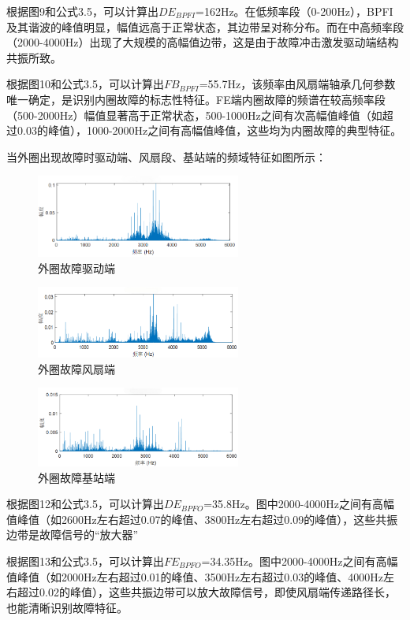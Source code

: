 \documentclass[a4paper]{CPIPC}
\numberwithin{equation}{section}
\begin{document}
根据图9和公式3.5，可以计算出$DE_{BPFI}$=162Hz。在低频率段（0-200Hz），BPFI及其谐波的峰值明显，幅值远高于正常状态，其边带呈对称分布。而在中高频率段（2000-4000Hz）出现了大规模的高幅值边带，这是由于故障冲击激发驱动端结构共振所致。

根据图10和公式3.5，可以计算出$FB_{BPFI}$=55.7Hz，该频率由风扇端轴承几何参数唯一确定，是识别内圈故障的标志性特征。FE端内圈故障的频谱在较高频率段（500-2000Hz）幅值显著高于正常状态，500-1000Hz之间有次高幅值峰值（如超过0.03的峰值），1000-2000Hz之间有高幅值峰值，这些均为内圈故障的典型特征。


当外圈出现故障时驱动端、风扇段、基站端的频域特征如图所示：
\begin{figure}[H]
  \centering
  \includegraphics[width=0.6\textwidth]{外圈故障驱动端.png}
  \caption{外圈故障驱动端}
  \label{fig:confidence}
\end{figure}\begin{figure}[H]
  \centering
  \includegraphics[width=0.6\textwidth]{外圈故障风扇端.png}
  \caption{外圈故障风扇端}
  \label{fig:confidence}
\end{figure}\begin{figure}[H]
  \centering
  \includegraphics[width=0.6\textwidth]{外圈故障基站端.png}
  \caption{外圈故障基站端}
  \label{fig:confidence}
\end{figure}
根据图12和公式3.5，可以计算出$DE_{BPFO}$=35.8Hz。图中2000-4000Hz之间有高幅值峰值（如2600Hz左右超过0.07的峰值、3800Hz左右超过0.09的峰值），这些共振边带是故障信号的“放大器”

根据图13和公式3.5，可以计算出$FE_{BPFO}$=34.35Hz。图中2000-4000Hz之间有高幅值峰值（如2000Hz左右超过0.01的峰值、3500Hz左右超过0.03的峰值、4000Hz左右超过0.02的峰值），这些共振边带可以放大故障信号，即使风扇端传递路径长，也能清晰识别故障特征。
\end{document}

